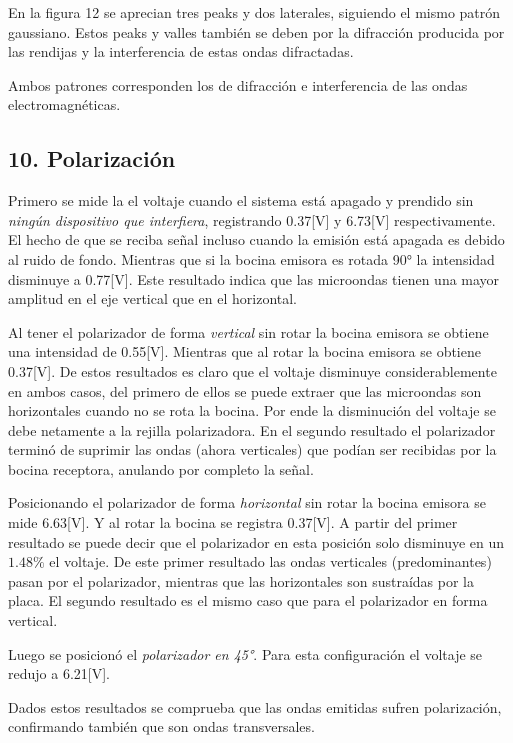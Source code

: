 \documentclass[a4paper,twocolumn,10pt]{article}
\begin{document}
En la figura 12 se aprecian tres peaks y dos laterales, siguiendo el mismo patrón gaussiano. Estos peaks y valles también se deben por la difracción producida por las rendijas y la interferencia de estas ondas difractadas.

Ambos patrones corresponden los de difracción e interferencia de las ondas electromagnéticas.



\subsection*{10. Polarización}
Primero se mide la el voltaje cuando el sistema está apagado y prendido sin \textit{ningún dispositivo que interfiera}, registrando 0.37[V] y 6.73[V] respectivamente. El hecho de que se reciba señal incluso cuando la emisión está apagada es debido al ruido de fondo. Mientras que si la bocina emisora es rotada 90° la intensidad disminuye a 0.77[V]. Este resultado indica que las microondas tienen una mayor amplitud en el eje vertical que en el horizontal.

Al tener el polarizador de forma \textit{vertical} sin rotar la bocina emisora se obtiene una intensidad de 0.55[V]. Mientras que al rotar la bocina emisora se obtiene 0.37[V]. De estos resultados es claro que el voltaje disminuye considerablemente en ambos casos, del primero de ellos se puede extraer que las microondas son horizontales cuando no se rota la bocina. Por ende la disminución del voltaje se debe netamente a la rejilla polarizadora. En el segundo resultado el polarizador terminó de suprimir las ondas (ahora verticales) que podían ser recibidas por la bocina receptora, anulando por completo la señal.

Posicionando el polarizador de forma \textit{horizontal} sin rotar la bocina emisora se mide 6.63[V]. Y al rotar la bocina se registra 0.37[V]. A partir del primer resultado se puede decir que el polarizador en esta posición solo disminuye en un $1.48\%$ el voltaje.
De este primer resultado las ondas verticales (predominantes) pasan por el polarizador, mientras que las horizontales son sustraídas por la placa.
El segundo resultado es el mismo caso que para el polarizador en forma vertical.

Luego se posicionó el \textit{polarizador en 45°}. Para esta configuración el voltaje se redujo a 6.21[V].

Dados estos resultados se comprueba que las ondas emitidas sufren polarización, confirmando también que son ondas transversales.
\end{document}
